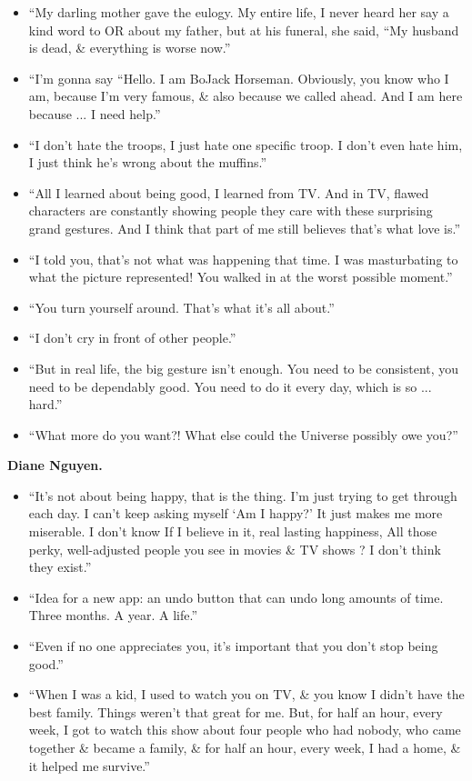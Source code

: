 \documentclass{article}
\begin{document}
\begin{enumerate}
\begin{itemize}
    	\item ``My darling mother gave the eulogy. My entire life, I never heard her say a kind word to OR about my father, but at his funeral, she said, ``My husband is dead, \& everything is worse now.''
    	\item ``I'm gonna say ``Hello. I am BoJack Horseman. Obviously, you know who I am, because I'm very famous, \& also because we called ahead. And I am here because ... I need help.''
    	\item ``I don't hate the troops, I just hate one specific troop. I don't even hate him, I just think he's wrong about the muffins.''
    	\item ``All I learned about being good, I learned from TV. And in TV, flawed characters are constantly showing people they care with these surprising grand gestures. And I think that part of me still believes that's what love is.''
    	\item ``I told you, that's not what was happening that time. I was masturbating to what the picture represented! You walked in at the worst possible moment.''
    	\item ``You turn yourself around. That's what it's all about.''
    	\item ``I don't cry in front of other people.''
    	\item ``But in real life, the big gesture isn't enough. You need to be consistent, you need to be dependably good. You need to do it every day, which is so ... hard.''
    	\item ``What more do you want?! What else could the Universe possibly owe you?''
    \end{itemize}
    {\bf Diane Nguyen.}
    \begin{itemize}
    	\item ``It's not about being happy, that is the thing. I'm just trying to get through each day. I can't keep asking myself `Am I happy?' It just makes me more miserable. I don't know If I believe in it, real lasting happiness, All those perky, well-adjusted people you see in movies \& TV shows ? I don't think they exist.''
    	\item ``Idea for a new app: an undo button that can undo long amounts of time. Three months. A year. A life.''
    	\item ``Even if no one appreciates you, it's important that you don't stop being good.''
    	\item ``When I was a kid, I used to watch you on TV, \& you know I didn't have the best family. Things weren't that great for me. But, for half an hour, every week, I got to watch this show about four people who had nobody, who came together \& became a family, \& for half an hour, every week, I had a home, \& it helped me survive.''

\end{itemize}
\end{enumerate}
\end{document}
